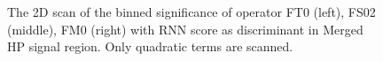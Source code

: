 \begin{figure}[ht]
    \centering
        \caption{The 2D scan of the binned significance of operator FT0 (left), FS02 (middle), FM0 (right) with RNN score as discriminant in Merged HP signal region. Only quadratic terms are scanned.}
        \label{fig:2lepaQGCBinnedSigRNN}
\end{figure}

